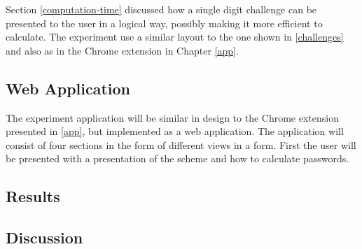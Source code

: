 \par Section \ref{computation-time} discussed how a single digit challenge can be presented to the user in a logical way, possibly making it more efficient to calculate. The experiment use a similar layout to the one shown in \autoref{challenges} and also as in the Chrome extension in Chapter \ref{app}. 



\subsection{Web Application}
The experiment application will be similar in design to the Chrome extension presented in \autoref{app}, but implemented as a web application. The application will consist of four sections in the form of different views in a form. First the user will be presented with a presentation of the scheme and how to calculate passwords.


\subsection{Results}

\subsection{Discussion}
\todo[inline]{}
